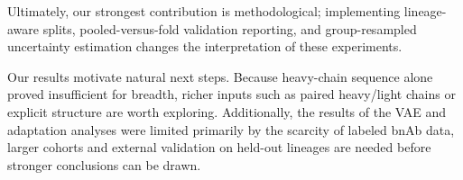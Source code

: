 Ultimately, our strongest contribution is methodological; implementing
lineage-aware splits, pooled-versus-fold validation reporting, and
group-resampled uncertainty estimation changes the interpretation
of these experiments.

Our results motivate natural next steps. Because
heavy-chain sequence alone proved insufficient for breadth, richer inputs such
as paired heavy/light chains or explicit structure are worth exploring.
Additionally,
the results of the VAE and adaptation analyses were limited primarily by the scarcity
of labeled bnAb data, larger cohorts and external validation on held-out
lineages are needed before stronger conclusions can be drawn.
